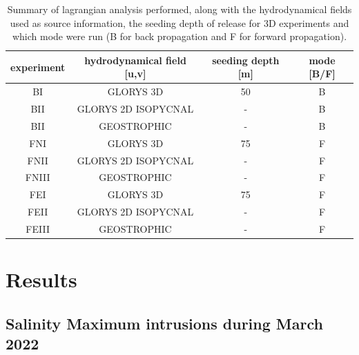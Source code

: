 \documentclass[draft]{agujournal2019}
\begin{document}
\begin{table}[ht!]
\label{tab:lagrangian_experiments}
\caption{Summary of lagrangian analysis performed, along with the hydrodynamical fields used as source information, the seeding depth of release for 3D experiments and which mode were run (B for back propagation and F for forward propagation).}
\begin{tabular}{c c c c}
\hline
\textbf{experiment} & \textbf{hydrodynamical field [u,v]} & \textbf{seeding depth [m]} & \textbf{mode {[}B/F{]}} \\
\hline
BI                  & GLORYS 3D                     & 50                     & B                       \\ 
BII                 & GLORYS 2D ISOPYCNAL           & -                      & B                       \\ 
BII                 & GEOSTROPHIC                   & -                      & B                       \\ 
FNI                 & GLORYS 3D                     & 75                     & F                       \\ 
FNII                & GLORYS 2D ISOPYCNAL           & -                      & F                       \\ 
FNIII               & GEOSTROPHIC                   & -                      & F                       \\ 
FEI                 & GLORYS 3D                     & 75                     & F                       \\ 
FEII                & GLORYS 2D ISOPYCNAL           & -                      & F                       \\ 
FEIII               & GEOSTROPHIC                   & -                      & F                       \\ 
\hline
\end{tabular}
\end{table}

\section{Results}
\label{section:description}

\subsection{Salinity Maximum intrusions during March 2022}
\label{subsec:smaxdesc}
\end{document}
